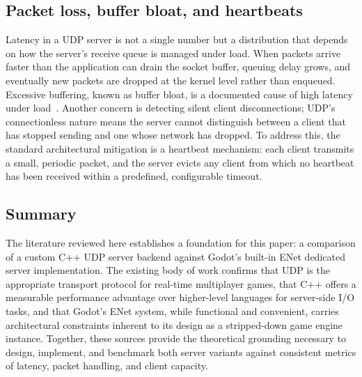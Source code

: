 \IfFileExists{IEEEtran.cls}{\ieeetrue\documentclass[conference]{IEEEtran}}{\ieeefalse\documentclass[twocolumn,10pt]{article}}
\begin{document}
\subsection{Packet loss, buffer bloat, and heartbeats}
Latency in a UDP server is not a single number but a distribution that depends on how the server's receive queue is managed under load. When packets arrive faster than the application can drain the socket buffer, queuing delay grows, and eventually new packets are dropped at the kernel level rather than enqueued. Excessive buffering, known as buffer bloat, is a documented cause of high latency under load~\cite{gettys2011}.
Another concern is detecting silent client disconnections; UDP's connectionless nature means the server cannot distinguish between a client that has stopped sending and one whose network has dropped. To address this, the standard architectural mitigation is a heartbeat mechanism: each client transmits a small, periodic packet, and the server evicts any client from which no heartbeat has been received within a predefined, configurable timeout.

\subsection{Summary}
The literature reviewed here establishes a foundation for this paper: a comparison of a custom C++ UDP server backend against Godot's built-in ENet dedicated server implementation. The existing body of work confirms that UDP is the appropriate transport protocol for real-time multiplayer games, that C++ offers a measurable performance advantage over higher-level languages for server-side I/O tasks, and that Godot's ENet system, while functional and convenient, carries architectural constraints inherent to its design as a stripped-down game engine instance. Together, these sources provide the theoretical grounding necessary to design, implement, and benchmark both server variants against consistent metrics of latency, packet handling, and client capacity.
\end{document}
